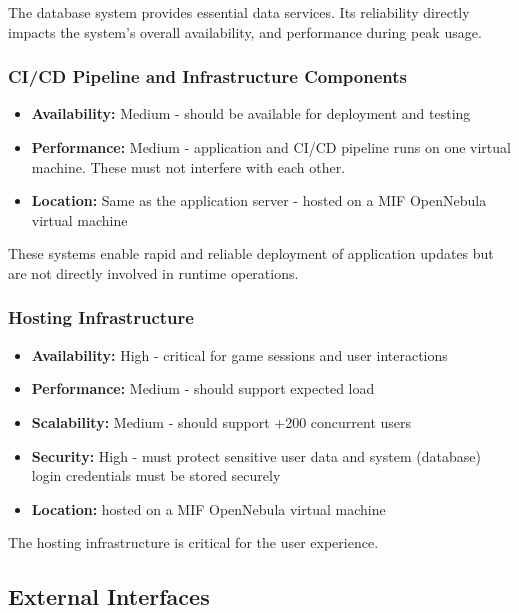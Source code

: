 The database system provides essential data services. Its
reliability directly impacts the system's overall availability, and
performance during peak usage.

\subsubsection{CI/CD Pipeline and Infrastructure Components}


\begin{itemize}
    \item \textbf{Availability:} Medium - should be available for deployment and testing
    \item \textbf{Performance:} Medium - application and CI/CD pipeline runs on one virtual machine. These must not interfere with each other.
    \item \textbf{Location:} Same as the application server - hosted on a MIF OpenNebula virtual machine
\end{itemize}

These systems enable rapid and reliable deployment of application updates but are not directly involved in runtime operations.

\subsubsection{Hosting Infrastructure}

\begin{itemize}
    \item \textbf{Availability:} High - critical for game sessions and user interactions
    \item \textbf{Performance:} Medium - should support expected load
    \item \textbf{Scalability:} Medium - should support +200 concurrent users
    \item \textbf{Security:} High - must protect sensitive user data and system (database) login credentials must be stored securely
    \item \textbf{Location:} hosted on a MIF OpenNebula virtual machine
\end{itemize}

The hosting infrastructure is critical for the user experience.



\subsection{External Interfaces}


